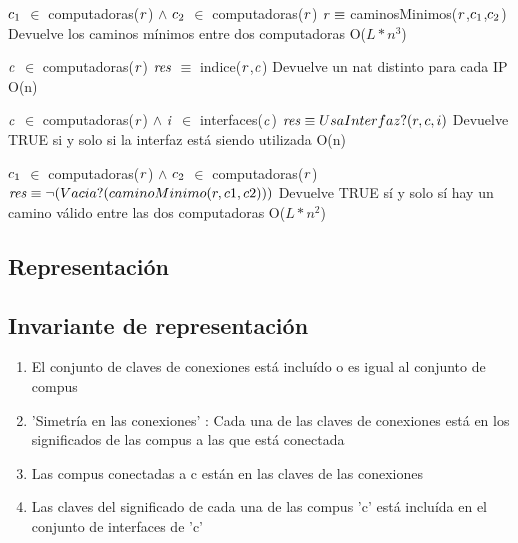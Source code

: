 {$\text{\textit{$c_{1}$}}$ $\in$ computadoras($\text{\textit{r}}$) $\land$ $\text{\textit{$c_{2}$}}$ $\in$ computadoras($\text{\textit{r}}$)}
 {$\text{\textit{r}} \equiv$ caminosMinimos($\text{\textit{r}}$,$\text{\textit{$c_{1}$}}$,$\text{\textit{$c_{2}$}}$)}
 {Devuelve los caminos mínimos entre dos computadoras}
 {O($L*n^3$)}

 {$\text{\textit{c}}$ $\in$ computadoras($\text{\textit{r}}$)}
 {$\text{\textit{res}}$ $\equiv$ indice($\text{\textit{r}}$,$\text{\textit{c}}$)}
 {Devuelve un nat distinto para cada IP}
 {O(n)}

 {$\text{\textit{c}}$ $\in$ computadoras($\text{\textit{r}}$) $\land$ $\text{\textit{i}}$ $\in$ interfaces($\text{\textit{c}}$)}
 {$\text{\textit{res}} \equiv UsaInterfaz?(r,c,i)$}
 {Devuelve TRUE si y solo si la interfaz está siendo utilizada}
 {O(n)}

 {$\text{\textit{$c_{1}$}}$ $\in$ computadoras($\text{\textit{r}}$) $\land$ $\text{\textit{$c_{2}$}}$ $\in$ computadoras($\text{\textit{r}}$)}
 {$\text{\textit{res}} \equiv \neg(Vacia?(caminoMinimo(r,c1,c2)))$}
 {Devuelve TRUE sí y solo sí hay un camino válido entre las dos computadoras}
 {O($L*n^2$)}

\subsection{Representación}

\subsection{Invariante de representación}
\begin{enumerate}
\item El conjunto de claves de conexiones está incluído o es igual al conjunto de compus
\item 'Simetría en las conexiones' : Cada una de las claves de conexiones está en los significados de las compus a las que está conectada
\item Las compus conectadas a c están en las claves de las conexiones
\item Las claves del significado de cada una de las compus 'c' está incluída en el conjunto de interfaces de 'c'
\end{enumerate}

